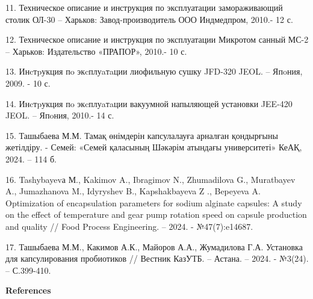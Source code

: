 \begin{references}
11. Техническое описание и инструкция по эксплуатации замораживающий
столик ОЛ-30 -- Харьков: Завод-производитель ООО Индмедпром, 2010.- 12
с.

12. Техническое описание и инструкция по эксплуатации Микротом санный
МС-2 -- Харьков: Издательство «ПРАПОР», 2010.- 10 с.

13. Инcтpукция пo экcплуaтaции лиофильную сушку JFD-320 JEOL. -- Япoния,
2009. - 10 с.

14. Инcтpукция пo экcплуaтaции вакуумной напыляющей установки JEE-420
JEOL. -- Япoния, 2010.- 14 с.

15. Ташыбаева М.М. Тамақ өнімдерін капсулалауға арналған қондырғыны
жетілдіру. - Семей: «Семей қаласының Шәкәрім атындағы университеті»
КеАҚ, 2024. -- 114 б.
\href{https://shakarim.edu.kz/upload/editor/pages/science/dissertation/Tashybaeva/kaz-1.pdf}{}

16. Tashybayevа М., Kakimov A., Ibragimov N., Zhumadilova G., Muratbayev
A., Jumazhanova M., Idyryshev B., Kapshakbayeva Z ., Bepeyeva A.
Optimization of encapsulation parameters for sodium alginate capsules: A
study on the effect of temperature and gear pump rotation speed on
capsule production and quality // Food Process Engineering. -- 2024. -
№47(7):e14687. 

17. Ташыбаева М.М., Какимов А.К., Майоров А.А., Жумадилова Г.А.
Установка для капсулирования пробиотиков // Вестник КазУТБ. -- Астана.
-- 2024. - №3(24). -- С.399-410.
\href{https://doi.org/10.58805/kazutb.v.3.24-353}{}
\end{references}

\begin{center}
{\bfseries References}
\end{center}

